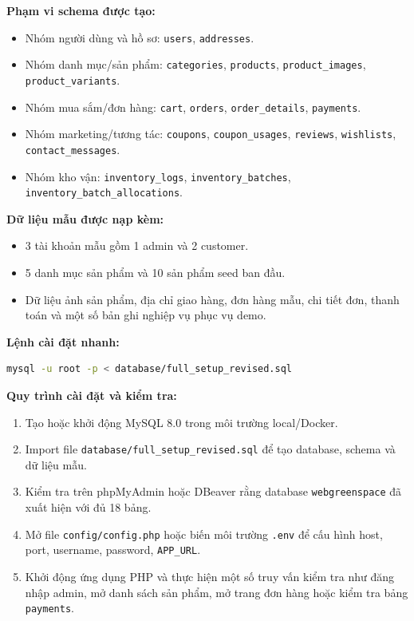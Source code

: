 \documentclass[a4paper]{article}
\begin{document}
\textbf{Phạm vi schema được tạo:}
\begin{itemize}
    \item Nhóm người dùng và hồ sơ: \texttt{users}, \texttt{addresses}.
    \item Nhóm danh mục/sản phẩm: \texttt{categories}, \texttt{products}, \texttt{product\_images}, \texttt{product\_variants}.
    \item Nhóm mua sắm/đơn hàng: \texttt{cart}, \texttt{orders}, \texttt{order\_details}, \texttt{payments}.
    \item Nhóm marketing/tương tác: \texttt{coupons}, \texttt{coupon\_usages}, \texttt{reviews}, \texttt{wishlists}, \texttt{contact\_messages}.
    \item Nhóm kho vận: \texttt{inventory\_logs}, \texttt{inventory\_batches}, \texttt{inventory\_batch\_allocations}.
\end{itemize}

\textbf{Dữ liệu mẫu được nạp kèm:}
\begin{itemize}
    \item 3 tài khoản mẫu gồm 1 admin và 2 customer.
    \item 5 danh mục sản phẩm và 10 sản phẩm seed ban đầu.
    \item Dữ liệu ảnh sản phẩm, địa chỉ giao hàng, đơn hàng mẫu, chi tiết đơn, thanh toán và một số bản ghi nghiệp vụ phục vụ demo.
\end{itemize}

\textbf{Lệnh cài đặt nhanh:}
\begin{lstlisting}[language=bash, caption=Cài đặt CSDL WebGreenSpace bằng script full setup]
mysql -u root -p < database/full_setup_revised.sql
\end{lstlisting}

\textbf{Quy trình cài đặt và kiểm tra:}
\begin{enumerate}
    \item Tạo hoặc khởi động MySQL 8.0 trong môi trường local/Docker.
    \item Import file \texttt{database/full\_setup\_revised.sql} để tạo database, schema và dữ liệu mẫu.
    \item Kiểm tra trên phpMyAdmin hoặc DBeaver rằng database \texttt{webgreenspace} đã xuất hiện với đủ 18 bảng.
    \item Mở file \texttt{config/config.php} hoặc biến môi trường \texttt{.env} để cấu hình host, port, username, password, \texttt{APP\_URL}.
    \item Khởi động ứng dụng PHP và thực hiện một số truy vấn kiểm tra như đăng nhập admin, mở danh sách sản phẩm, mở trang đơn hàng hoặc kiểm tra bảng \texttt{payments}.
\end{enumerate}
\end{document}
